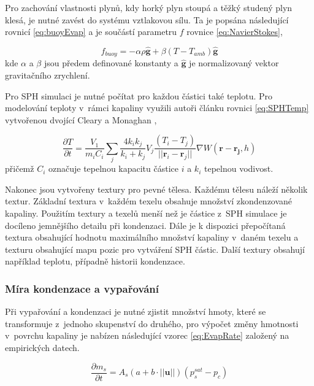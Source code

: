 Pro zachování vlastnosti plynů, kdy horký plyn stoupá a těžký studený plyn klesá, je nutné zavést do systému vztlakovou sílu. Ta je popsána následující rovnicí \ref{eq:buoyEvap} a je součástí parametru $f$ rovnice \ref{eq:NavierStokes},

\begin{equation}
\label{eq:buoyEvap}
	f_{buoy} = -\alpha \rho \hat{\mathbf{g}} + \beta(T - T_{amb})\hat{\mathbf{g}}
\end{equation}
kde $\alpha$ a $\beta$ jsou předem definované konstanty a $\hat{\mathbf{g}}$ je normalizovaný vektor gravitačního zrychlení.

Pro SPH simulaci je nutné počítat pro každou částici také teplotu. Pro modelování teploty v~rámci kapaliny využili autoři článku rovnici \ref{eq:SPHTemp} vytvořenou dvojící Cleary a Monaghan \cite{Cleary99}, 

\begin{equation}
	\frac{\partial T}{\partial t} = \frac{V_1}{m_i C_i} \sum_j \frac{4 k_i k_j}{k_i + k_j} V_j \frac{(T_i - T_j)}{||\mathbf{r}_i - \mathbf{r}_j||}\nabla W(\mathbf{r} - \mathbf{r_j},h)
	\label{eq:SPHTemp}
\end{equation}
přičemž $C_i$ označuje tepelnou kapacitu částice $i$ a $k_i$ tepelnou vodivost.

Nakonec jsou vytvořeny textury pro pevné tělesa. Každému tělesu náleží několik textur. Základní textura v~každém texelu obsahuje množství zkondenzované kapaliny. Použitím textury a texelů menší než je částice z~SPH simulace je docíleno jemnějšího detailu při kondenzaci. Dále je k dispozici přepočítaná textura obsahující hodnotu maximálního množství kapaliny v~daném texelu a texturu obsahující mapu pozic pro vytváření SPH částic. Další textury obsahují například teplotu, případně historii kondenzace.

\subsubsection{Míra kondenzace a vypařování}
Při vypařování a kondenzaci je nutné zjistit množství hmoty, které se transformuje z~jednoho skupenství do druhého, pro výpočet změny hmotnosti v~povrchu kapaliny je nabízen následující vzorec \ref{eq:EvapRate} založený na empirických datech. \cite{SMITH94}

\begin{equation}
	\frac{\partial m_s}{\partial t} = A_s(a + b \cdot ||\mathbf{u}||)(p_s^{sat} - p_c)
	\label{eq:EvapRate}
\end{equation}

